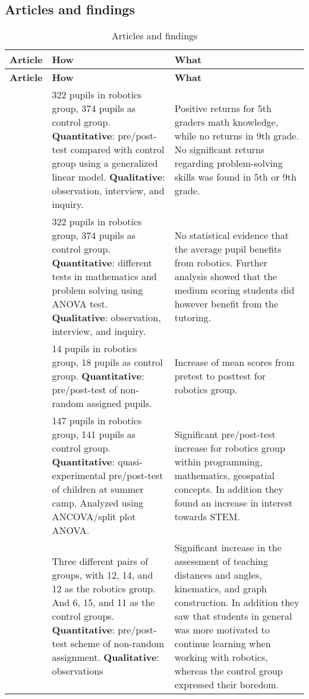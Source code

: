 \subsection*{Articles and findings}
\setlength\LTleft{0px}
\setlength\LTright{0px}
\begin{longtable}{@{\extracolsep{\fill}}p{}p{}@{\hspace{10pt}}p{}}
	\hline \multicolumn{1}{l}{\textbf{Article}} & \multicolumn{1}{l}{\textbf{How}} & \multicolumn{1}{l}{\textbf{What}} \\ \hline\hline
	\endfirsthead
	\hline \multicolumn{1}{l}{\textbf{Article}} & \multicolumn{1}{l}{\textbf{How}} & \multicolumn{1}{l}{\textbf{What}} \\ \hline\hline
	\endhead
	\hline \caption{Articles and findings}\endlastfoot
	\tcite{hussain2006effect} & 322 pupils in robotics group, 374 pupils as control group. \textbf{Quantitative}: pre/post-test compared with control group using a generalized linear model. \textbf{Qualitative}: observation, interview, and inquiry. & Positive returns for 5th graders math knowledge, while no returns in 9th grade. No significant returns regarding problem-solving skills was found in 5th or 9th grade. \\\hline
	
	\tcite{lindh2007does} & 322 pupils in robotics group, 374 pupils as control group. \textbf{Quantitative}: different tests in mathematics and problem solving using ANOVA test. \textbf{Qualitative}: observation, interview, and inquiry. &  No statistical evidence that the average pupil benefits from robotics. Further analysis showed that the medium scoring students did however benefit from the tutoring. \\\hline
	
	\tcite{barker2007robotics} & 14 pupils in robotics group, 18 pupils as control group. \textbf{Quantitative}: pre/post-test of non-random assigned pupils. & Increase of mean scores from pretest to posttest for robotics group. \\\hline
	\tcite{nugent2009use} & 147 pupils in robotics group, 141 pupils as control group. \textbf{Quantitative}: quasi-experimental pre/post-test of children at summer camp. Analyzed using ANCOVA/split plot ANOVA. & Significant pre/post-test increase for robotics group within programming, mathematics, geospatial concepts. In addition they found an increase in interest towards STEM.  \\\hline
	
	\tcite{mitnik2008autonomous} & Three different pairs of groups, with 12, 14, and 12 as the robotics group. And 6, 15, and 11 as the control groups. \textbf{Quantitative}: pre/post-test scheme of non-random assignment. \textbf{Qualitative}: observations  & Significant increase in the assessment of teaching distances and angles, kinematics, and graph construction. In addition they saw that students in general was more motivated to continue learning when working with robotics, whereas the control group expressed their boredom.  \\\hline
	

\end{longtable}

